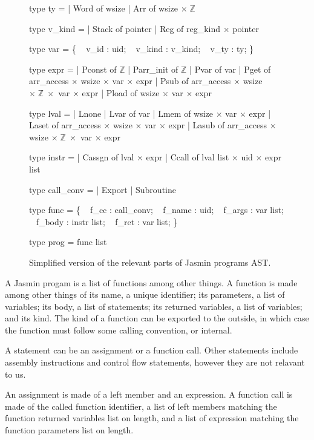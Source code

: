 \documentclass{article}
\newcommand\setZ{\mathbb{Z}}
\begin{document}
\begin{figure}
\obeylines\obeyspaces\ttfamily%
type ty =
| Word of wsize
| Arr  of wsize \(\times\;\setZ\)

type v\_kind =
| Stack of pointer
| Reg   of reg\_kind \(\times\) pointer

type var = \{
~ v\_id   : uid;
~ v\_kind : v\_kind;
~ v\_ty   : ty;
\}

type expr =
| Pconst of \(\setZ\)
| Parr\_init of \(\setZ\)
| Pvar   of var
| Pget   of arr\_access \(\times\) wsize \(\times\) var \(\times\) expr
| Psub   of arr\_access \(\times\) wsize \(\times\;\setZ\;\times\) var \(\times\) expr
| Pload  of wsize \(\times\) var \(\times\) expr

type lval =
| Lnone
| Lvar  of var
| Lmem  of wsize \(\times\) var \(\times\) expr
| Laset of arr\_access \(\times\) wsize \(\times\) var \(\times\) expr
| Lasub of arr\_access \(\times\) wsize \(\times\;\setZ\;\times\) var \(\times\) expr

type instr =
| Cassgn of lval \(\times\) expr
| Ccall  of lval list \(\times\) uid \(\times\) expr list

type call\_conv =
| Export
| Subroutine

type func = \{
~ f\_cc   : call\_conv;
~ f\_name : uid;
~ f\_args : var list;
~ f\_body : instr list;
~ f\_ret  : var list;
\}

type prog = func list
\normalfont%
\caption{Simplified version of the relevant parts of Jasmin programs AST.}
\end{figure}

A Jasmin progam is a list of functions among other things. A function is made
among other things of its name, a unique identifier; its parameters, a list of
variables; its body, a list of statements; its returned variables, a list of
variables; and its kind. The kind of a function can be exported to the outside,
in which case the function must follow some calling convention, or internal.

\smallskip

A statement can be an assignment or a function call.
Other statements include assembly instructions and control flow statements,
however they are not relavant to us.

An assignment is made of a left member and an expression. A function call is
made of the called function identifier, a list of left members matching the
function returned variables list on length, and a list of expression matching
the function parameters list on length.
\end{document}
